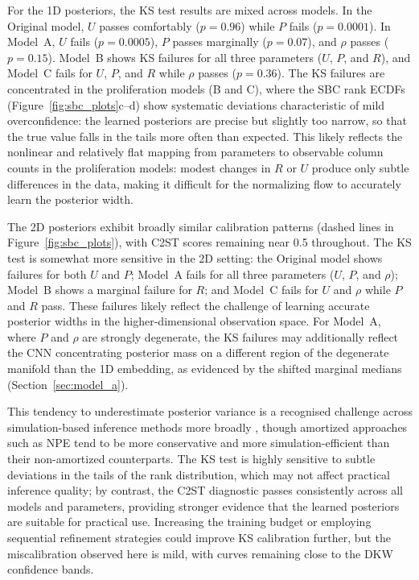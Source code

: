 \documentclass{article}
\providecommand{\DIFaddtex}[1]{{\protect\color{blue} \sf #1}} %
\providecommand{\DIFadd}[1]{\texorpdfstring{\DIFaddtex{#1}}{#1}} %
\begin{document}
\DIFadd{For the 1D posteriors, the KS test results are mixed across models. In the Original model, $U$ passes comfortably ($p = 0.96$) while $P$ fails ($p = 0.0001$). In Model~A, $U$ fails ($p = 0.0005$), $P$ passes marginally ($p = 0.07$), and $\rho$ passes ($p = 0.15$). Model~B shows KS failures for all three parameters ($U$, $P$, and $R$), and Model~C fails for $U$, $P$, and $R$ while $\rho$ passes ($p = 0.36$). The KS failures are concentrated in the proliferation models (B and C), where the SBC rank ECDFs (Figure~\ref{fig:sbc_plots}c--d) show systematic deviations characteristic of mild overconfidence: the learned posteriors are precise but slightly too narrow, so that the true value falls in the tails more often than expected. This likely reflects the nonlinear and relatively flat mapping from parameters to observable column counts in the proliferation models: modest changes in $R$ or $U$ produce only subtle differences in the data, making it difficult for the normalizing flow to accurately learn the posterior width.
}

\DIFadd{The 2D posteriors exhibit broadly similar calibration patterns (dashed lines in Figure~\ref{fig:sbc_plots}), with C2ST scores remaining near 0.5 throughout. The KS test is somewhat more sensitive in the 2D setting: the Original model shows failures for both $U$ and $P$; Model~A fails for all three parameters ($U$, $P$, and $\rho$); Model~B shows a marginal failure for $R$; and Model~C fails for $U$ and $\rho$ while $P$ and $R$ pass. These failures likely reflect the challenge of learning accurate posterior widths in the higher-dimensional observation space. For Model~A, where $P$ and $\rho$ are strongly degenerate, the KS failures may additionally reflect the CNN concentrating posterior mass on a different region of the degenerate manifold than the 1D embedding, as evidenced by the shifted marginal medians (Section~\ref{sec:model_a}).
}

\DIFadd{This tendency to underestimate posterior variance is a recognised challenge across simulation-based inference methods more broadly \citep{hermans2022crisis}, though amortized approaches such as NPE tend to be more conservative and more simulation-efficient than their non-amortized counterparts. The KS test is highly sensitive to subtle deviations in the tails of the rank distribution, which may not affect practical inference quality; by contrast, the C2ST diagnostic passes consistently across all models and parameters, providing stronger evidence that the learned posteriors are suitable for practical use. Increasing the training budget or employing sequential refinement strategies could improve KS calibration further, but the miscalibration observed here is mild, with curves remaining close to the DKW confidence bands.
}
\end{document}
